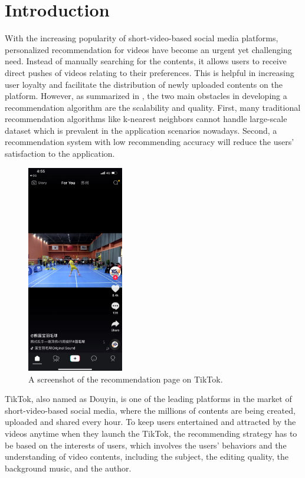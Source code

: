 \documentclass{article}
\begin{document}
\section{Introduction}
\label{sec:intro}

With the increasing popularity of short-video-based social media platforms, personalized recommendation for videos have become an urgent yet challenging need. Instead of manually searching for the contents, it allows users to receive direct pushes of videos relating to their preferences. This is helpful in increasing user loyalty and facilitate the distribution of newly uploaded contents on the platform. However, as summarized in \cite{sarwar_item-based_2001}, the two main obstacles in developing a recommendation algorithm are the scalability and quality. First, many traditional recommendation algorithms like k-nearest neighbors cannot handle large-scale dataset which is prevalent in the application scenarios nowadays. Second, a recommendation system with low recommending accuracy will reduce the users' satisfaction to the application.

\begin{figure}[h]
  \centering
  \includegraphics[width=4.2cm]{media/tiktok}
  \caption{A screenshot of the recommendation page on TikTok.}
  \label{fig:tiktok}
\end{figure}

TikTok, also named as Douyin, is one of the leading platforms in the market of short-video-based social media, where the millions of contents are being created, uploaded and shared every hour. To keep users entertained and attracted by the videos anytime when they launch the TikTok, the recommending strategy has to be based on the interests of users, which involves the users' behaviors and the understanding of video contents, including the subject, the editing quality, the background music, and the author.
\end{document}
